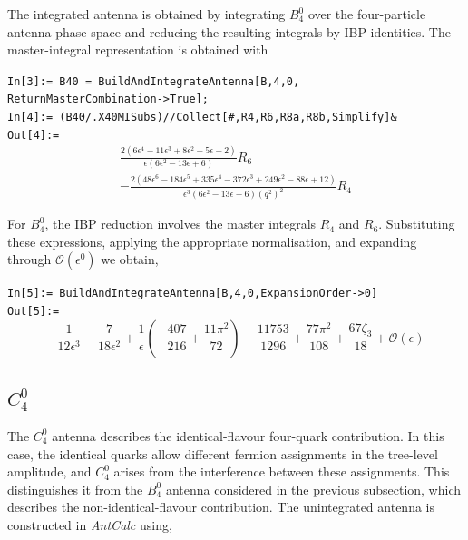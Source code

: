 The integrated antenna is obtained by integrating $B_4^0$ over the four-particle antenna phase
space and reducing the resulting integrals by IBP identities. The master-integral representation
is obtained with

\begin{mdframed}[backgroundcolor=gray!10, linewidth=0pt]
\texttt{In[3]:= B40 = BuildAndIntegrateAntenna[B,4,0,\\ReturnMasterCombination->True];}\\
\texttt{In[4]:= (B40/.X40MISubs)//Collect[\#,{R4,R6,R8a,R8b},Simplify]\&}\\
\hfill
\texttt{Out[4]:=}
    \begin{equation*}
        \begin{gathered}
            \frac{2\left(6\epsilon^4-11\epsilon^3+8\epsilon^2-5\epsilon+2\right)}{\epsilon\left(6\epsilon^2-13\epsilon+6\right)}R_6\\
            -\frac{2\left(48\epsilon^6-184\epsilon^5+335\epsilon^4-372\epsilon^3+249\epsilon^2-88\epsilon+12\right)}{\epsilon^3\left(6\epsilon^2-13\epsilon+6\right)\left(q^2\right)^2}R_4
        \end{gathered}
    \end{equation*}
\end{mdframed}

For $B_4^0$, the IBP reduction involves the master integrals $R_4$ and $R_6$. Substituting
these expressions, applying the appropriate normalisation, and expanding through
$\mathcal O(\epsilon^0)$ we obtain,

\begin{mdframed}[backgroundcolor=gray!10, linewidth=0pt]
\texttt{In[5]:= BuildAndIntegrateAntenna[B,4,0,ExpansionOrder->0]}\\
\hfill
\texttt{Out[5]:=}
    \begin{equation*}
        -\frac1{12\epsilon^3}-\frac7{18\epsilon^2}+\frac{1}{\epsilon}\!\left(-\frac{407}{216}+\frac{11\pi^2}{72}\right)-\frac{11753}{1296}+\frac{77\pi^2}{108}+\frac{67\zeta_3}{18}+\mathcal O(\epsilon)
    \end{equation*}
\end{mdframed}

\subsection{$C_4^0$}\label{subsec:C40}

The $C_4^0$ antenna describes the identical-flavour four-quark contribution. In this case, the
identical quarks allow different fermion assignments in the tree-level amplitude, and $C_4^0$
arises from the interference between these assignments. This distinguishes it from the $B_4^0$
antenna considered in the previous subsection, which describes the non-identical-flavour
contribution. The unintegrated antenna is constructed in \textit{AntCalc} using,

